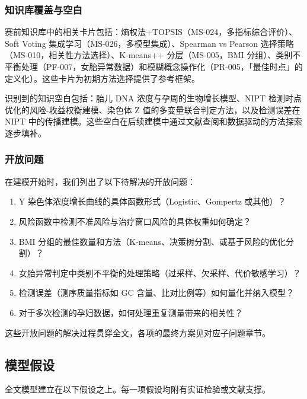 \documentclass{mcm-paper}
\begin{document}
\subsubsection{知识库覆盖与空白}

赛前知识库中的相关卡片包括：熵权法+TOPSIS（MS-024，多指标综合评价）、Soft Voting 集成学习（MS-026，多模型集成）、Spearman vs Pearson 选择策略（MS-010，相关性方法选择）、K-means++ 分层（MS-005，BMI 分组）、类别不平衡处理（PF-007，女胎异常数据）和模糊概念操作化（PR-005，「最佳时点」的定义化）。这些卡片为初期方法选择提供了参考框架。

识别到的知识空白包括：胎儿 DNA 浓度与孕周的生物增长模型、NIPT 检测时点优化的风险-收益权衡建模、染色体 Z 值的多变量联合判定方法，以及检测误差在 NIPT 中的传播建模。这些空白在后续建模中通过文献查阅和数据驱动的方法探索逐步填补。

\subsubsection{开放问题}

在建模开始时，我们列出了以下待解决的开放问题：

\begin{enumerate}
    \item Y 染色体浓度增长曲线的具体函数形式（Logistic、Gompertz 或其他）？
    \item 风险函数中检测不准风险与治疗窗口风险的具体权重如何确定？
    \item BMI 分组的最佳数量和方法（K-means、决策树分割、或基于风险的优化分割）？
    \item 女胎异常判定中类别不平衡的处理策略（过采样、欠采样、代价敏感学习）？
    \item 检测误差（测序质量指标如 GC 含量、比对比例等）如何量化并纳入模型？
    \item 对于多次检测的孕妇数据，如何处理重复测量带来的相关性？
\end{enumerate}

这些开放问题的解决过程贯穿全文，各项的最终方案见对应子问题章节。

\subsection{模型假设}

全文模型建立在以下假设之上。每一项假设均附有实证检验或文献支撑。
\end{document}

